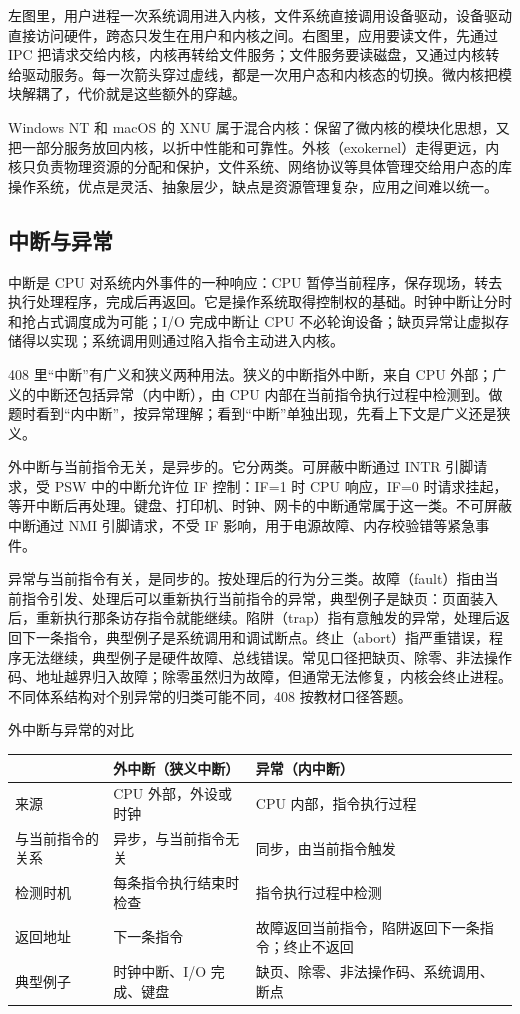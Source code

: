 左图里，用户进程一次系统调用进入内核，文件系统直接调用设备驱动，设备驱动直接访问硬件，跨态只发生在用户和内核之间。右图里，应用要读文件，先通过 IPC 把请求交给内核，内核再转给文件服务；文件服务要读磁盘，又通过内核转给驱动服务。每一次箭头穿过虚线，都是一次用户态和内核态的切换。微内核把模块解耦了，代价就是这些额外的穿越。

Windows NT 和 macOS 的 XNU 属于混合内核：保留了微内核的模块化思想，又把一部分服务放回内核，以折中性能和可靠性。外核（exokernel）走得更远，内核只负责物理资源的分配和保护，文件系统、网络协议等具体管理交给用户态的库操作系统，优点是灵活、抽象层少，缺点是资源管理复杂，应用之间难以统一。

\subsection{中断与异常}

中断是 CPU 对系统内外事件的一种响应：CPU 暂停当前程序，保存现场，转去执行处理程序，完成后再返回。它是操作系统取得控制权的基础。时钟中断让分时和抢占式调度成为可能；I/O 完成中断让 CPU 不必轮询设备；缺页异常让虚拟存储得以实现；系统调用则通过陷入指令主动进入内核。

408 里“中断”有广义和狭义两种用法。狭义的中断指外中断，来自 CPU 外部；广义的中断还包括异常（内中断），由 CPU 内部在当前指令执行过程中检测到。做题时看到“内中断”，按异常理解；看到“中断”单独出现，先看上下文是广义还是狭义。

外中断与当前指令无关，是异步的。它分两类。可屏蔽中断通过 INTR 引脚请求，受 PSW 中的中断允许位 IF 控制：IF=1 时 CPU 响应，IF=0 时请求挂起，等开中断后再处理。键盘、打印机、时钟、网卡的中断通常属于这一类。不可屏蔽中断通过 NMI 引脚请求，不受 IF 影响，用于电源故障、内存校验错等紧急事件。

异常与当前指令有关，是同步的。按处理后的行为分三类。故障（fault）指由当前指令引发、处理后可以重新执行当前指令的异常，典型例子是缺页：页面装入后，重新执行那条访存指令就能继续。陷阱（trap）指有意触发的异常，处理后返回下一条指令，典型例子是系统调用和调试断点。终止（abort）指严重错误，程序无法继续，典型例子是硬件故障、总线错误。常见口径把缺页、除零、非法操作码、地址越界归入故障；除零虽然归为故障，但通常无法修复，内核会终止进程。不同体系结构对个别异常的归类可能不同，408 按教材口径答题。

\begin{tablebox}{外中断与异常的对比}
\centering
\small
\begin{tabularx}{\linewidth}{|p{3.3cm}|X|X|}
\hline
 & 外中断（狭义中断） & 异常（内中断） \\
\hline
来源 & CPU 外部，外设或时钟 & CPU 内部，指令执行过程 \\
\hline
与当前指令的关系 & 异步，与当前指令无关 & 同步，由当前指令触发 \\
\hline
检测时机 & 每条指令执行结束时检查 & 指令执行过程中检测 \\
\hline
返回地址 & 下一条指令 & 故障返回当前指令，陷阱返回下一条指令；终止不返回 \\
\hline
典型例子 & 时钟中断、I/O 完成、键盘 & 缺页、除零、非法操作码、系统调用、断点 \\
\hline
\end{tabularx}
\end{tablebox}

